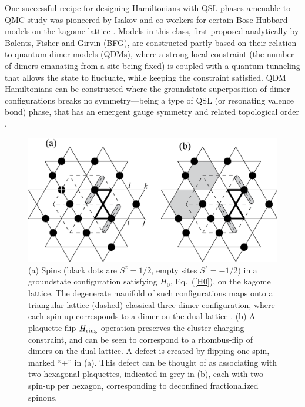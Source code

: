 \documentclass[range]{ar2e}
\begin{document}
One successful recipe for designing Hamiltonians with QSL phases amenable to QMC study was pioneered by Isakov and co-workers for certain Bose-Hubbard models on the kagome 
lattice \cite{Isakov1, Isakov2, TopoEE}.  Models in this class, first proposed analytically by Balents, Fisher and Girvin \cite{BFG} (BFG), are constructed partly based on their 
relation to quantum dimer models (QDMs), where a strong local constraint (the number of dimers emanating from a site being fixed) is coupled with a quantum tunneling that allows 
the state to fluctuate, while keeping the constraint satisfied. QDM Hamiltonians can be constructed where the groundstate superposition of dimer configurations breaks no 
symmetry---being a type of QSL (or resonating valence bond) phase, that has an emergent gauge symmetry and related topological order \cite{Misguich1}.

\begin{figure}
\centerline{\includegraphics[width=4.5in]{kagome}}
\caption{ (a) Spins (black dots are $S^z = 1/2$, empty sites $S^z = -1/2$) in a groundstate configuration satisfying $H_0$, Eq.~(\ref{H0}), on the kagome lattice.  
The degenerate manifold of such configurations maps onto a triangular-lattice (dashed) classical three-dimer configuration, where each spin-up corresponds to a dimer 
on the dual lattice \cite{BFG}. (b) A plaquette-flip $H_{\rm ring}$ operation preserves the cluster-charging constraint, and can be seen to correspond 
to a rhombus-flip of dimers on the dual lattice.  A defect is created by flipping one spin, marked ``+'' in (a).  This defect can be thought of as associating with 
two hexagonal plaquettes, indicated in grey in (b), each with two spin-up per hexagon, corresponding to deconfined fractionalized spinons.} \label{kag_fig}
\end{figure}
\end{document}
